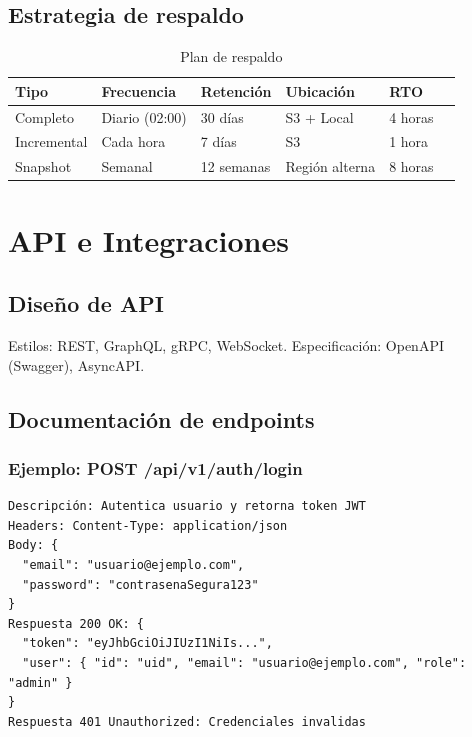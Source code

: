 \documentclass[a4paper,11pt,spanish]{article}
\begin{document}
\subsection{Estrategia de respaldo}

\begin{table}[H]
\centering
\caption{Plan de respaldo}
\label{tab:respaldo}
\begin{tabular}{@{}llllll@{}}
\toprule
\textbf{Tipo} & \textbf{Frecuencia} & \textbf{Retención} & \textbf{Ubicación} & \textbf{RTO} \\
\midrule
Completo & Diario (02:00) & 30 días & S3 + Local & 4 horas \\
Incremental & Cada hora & 7 días & S3 & 1 hora \\
Snapshot & Semanal & 12 semanas & Región alterna & 8 horas \\
\bottomrule
\end{tabular}
\end{table}

\newpage

\section{API e Integraciones}

\subsection{Diseño de API}

Estilos: REST, GraphQL, gRPC, WebSocket. Especificación: OpenAPI (Swagger), AsyncAPI.

\subsection{Documentación de endpoints}

\subsubsection*{Ejemplo: POST /api/v1/auth/login}

\begin{lstlisting}
Descripción: Autentica usuario y retorna token JWT
Headers: Content-Type: application/json
Body: {
  "email": "usuario@ejemplo.com",
  "password": "contrasenaSegura123"
}
Respuesta 200 OK: {
  "token": "eyJhbGciOiJIUzI1NiIs...",
  "user": { "id": "uid", "email": "usuario@ejemplo.com", "role": "admin" }
}
Respuesta 401 Unauthorized: Credenciales invalidas
\end{lstlisting}
\end{document}
